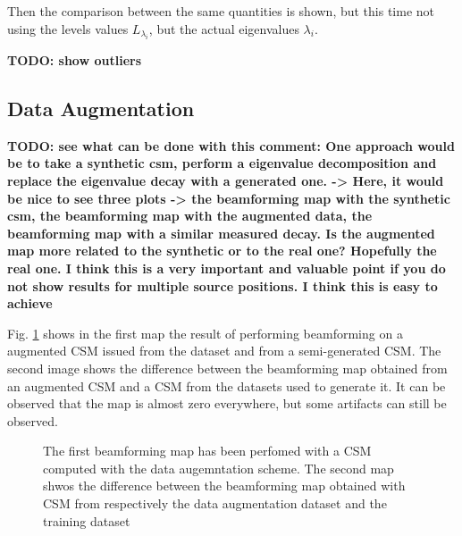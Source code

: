 \documentclass[11pt,a4paper,twoside]{report}
\begin{document}
Then the comparison between the same quantities is shown, but this time not using the levels values $L_{\lambda_i}$, but the actual eigenvalues $\lambda_{i}$.

\textbf{TODO: show outliers}

\subsection{Data Augmentation}

\textbf{TODO: see what can be done with this comment: One approach would be to take a synthetic csm, perform a eigenvalue decomposition and replace the eigenvalue decay with a generated one. -> Here, it would be nice to see three plots -> the beamforming map with the synthetic csm, the beamforming map with the augmented data, the beamforming map with a similar measured decay. Is the augmented map more related to the synthetic or to the real one? Hopefully the real one. I think this is a very important and valuable point if you do not show results for multiple source positions.
I think this is easy to achieve}

Fig. \ref{fig:beamforming_map_data_augmentation} shows in the first map the result of performing beamforming on a augmented CSM issued from the dataset and from a semi-generated CSM. The second image shows the difference between the beamforming map obtained from an augmented CSM and a CSM from the datasets used to generate it. It can be observed that the map is almost zero everywhere, but some artifacts can still be observed.

\begin{figure}
    \centering
    \caption{The first beamforming map has been perfomed with a CSM computed with the data augemntation scheme. The second map shwos the difference between the beamforming map obtained with CSM from respectively the data augmentation dataset and the training dataset}
    \label{fig:beamforming_map_data_augmentation}
\end{figure}
\end{document}
